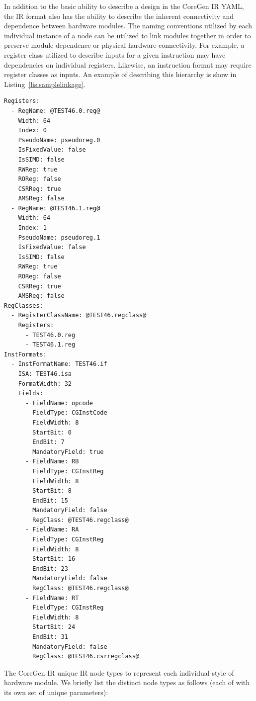\documentclass{article}
\begin{document}
In addition to the basic ability to describe a design in the CoreGen IR YAML, 
the IR format also has the ability to describe the inherent connectivity 
and dependence between hardware modules.  The naming conventions 
utilized by each individual instance of a node can be utilized to link 
modules together in order to preserve module dependence or physical 
hardware connectivity.  For example, a register class utilized to describe 
inputs for a given instruction may have dependencies on individual registers.  
Likewise, an instruction format may require register classes as inputs.  An example 
of describing this hierarchy is show in Listing~\ref{lis:samplelinkage}.  

\vspace{0.125in}
\begin{lstlisting}[frame=single,style=base,caption={Example IR Node Linkage},captionpos=b,label={lis:samplelinkage}]
Registers:
  - RegName: @TEST46.0.reg@
    Width: 64
    Index: 0
    PseudoName: pseudoreg.0
    IsFixedValue: false
    IsSIMD: false
    RWReg: true
    ROReg: false
    CSRReg: true
    AMSReg: false
  - RegName: @TEST46.1.reg@
    Width: 64
    Index: 1
    PseudoName: pseudoreg.1
    IsFixedValue: false
    IsSIMD: false
    RWReg: true
    ROReg: false
    CSRReg: true
    AMSReg: false
RegClasses:
  - RegisterClassName: @TEST46.regclass@
    Registers:
      - TEST46.0.reg
      - TEST46.1.reg
InstFormats:
  - InstFormatName: TEST46.if
    ISA: TEST46.isa
    FormatWidth: 32
    Fields:
      - FieldName: opcode
        FieldType: CGInstCode
        FieldWidth: 8
        StartBit: 0
        EndBit: 7
        MandatoryField: true
      - FieldName: RB
        FieldType: CGInstReg
        FieldWidth: 8
        StartBit: 8
        EndBit: 15
        MandatoryField: false
        RegClass: @TEST46.regclass@
      - FieldName: RA
        FieldType: CGInstReg
        FieldWidth: 8
        StartBit: 16
        EndBit: 23
        MandatoryField: false
        RegClass: @TEST46.regclass@
      - FieldName: RT
        FieldType: CGInstReg
        FieldWidth: 8
        StartBit: 24
        EndBit: 31
        MandatoryField: false
        RegClass: @TEST46.csrregclass@
\end{lstlisting}

The CoreGen IR unique IR node types to represent each individual style of hardware module.  
We briefly list the distinct node types as follows (each of with its own set of unique parameters): 
\end{document}
